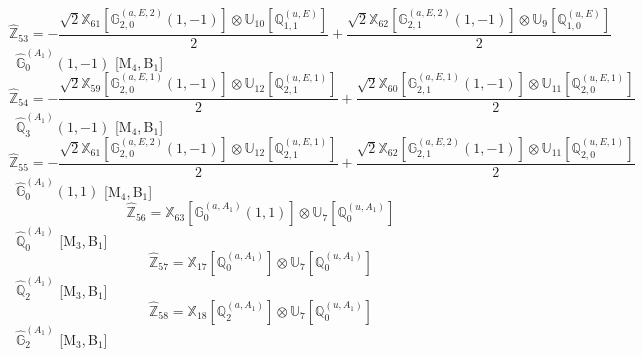 \documentclass[fleqn,10pt,landscape]{article}
\begin{document}
\begin{itemize}
\begin{dmath*}
\hat{\mathbb{Z}}_{53}=- \frac{\sqrt{2} \mathbb{X}_{61}[\mathbb{G}_{2,0}^{(a,E,2)}(1,-1)] \otimes\mathbb{U}_{10}[\mathbb{Q}_{1,1}^{(u,E)}]}{2} + \frac{\sqrt{2} \mathbb{X}_{62}[\mathbb{G}_{2,1}^{(a,E,2)}(1,-1)] \otimes\mathbb{U}_{9}[\mathbb{Q}_{1,0}^{(u,E)}]}{2}
\end{dmath*}
\vspace{4mm}
\noindent {} $\,\,\,\hat{\mathbb{G}}_{0}^{(A_{1})}(1,-1)$ [M$_{4}$,\,B$_{1}$]
\begin{dmath*}
\hat{\mathbb{Z}}_{54}=- \frac{\sqrt{2} \mathbb{X}_{59}[\mathbb{G}_{2,0}^{(a,E,1)}(1,-1)] \otimes\mathbb{U}_{12}[\mathbb{Q}_{2,1}^{(u,E,1)}]}{2} + \frac{\sqrt{2} \mathbb{X}_{60}[\mathbb{G}_{2,1}^{(a,E,1)}(1,-1)] \otimes\mathbb{U}_{11}[\mathbb{Q}_{2,0}^{(u,E,1)}]}{2}
\end{dmath*}
\vspace{4mm}
\noindent {} $\,\,\,\hat{\mathbb{Q}}_{3}^{(A_{1})}(1,-1)$ [M$_{4}$,\,B$_{1}$]
\begin{dmath*}
\hat{\mathbb{Z}}_{55}=- \frac{\sqrt{2} \mathbb{X}_{61}[\mathbb{G}_{2,0}^{(a,E,2)}(1,-1)] \otimes\mathbb{U}_{12}[\mathbb{Q}_{2,1}^{(u,E,1)}]}{2} + \frac{\sqrt{2} \mathbb{X}_{62}[\mathbb{G}_{2,1}^{(a,E,2)}(1,-1)] \otimes\mathbb{U}_{11}[\mathbb{Q}_{2,0}^{(u,E,1)}]}{2}
\end{dmath*}
\vspace{4mm}
\noindent {} $\,\,\,\hat{\mathbb{G}}_{0}^{(A_{1})}(1,1)$ [M$_{4}$,\,B$_{1}$]
\begin{dmath*}
\hat{\mathbb{Z}}_{56}=\mathbb{X}_{63}[\mathbb{G}_{0}^{(a,A_{1})}(1,1)] \otimes\mathbb{U}_{7}[\mathbb{Q}_{0}^{(u,A_{1})}]
\end{dmath*}
\vspace{4mm}
\noindent {} $\,\,\,\hat{\mathbb{Q}}_{0}^{(A_{1})}$ [M$_{3}$,\,B$_{1}$]
\begin{dmath*}
\hat{\mathbb{Z}}_{57}=\mathbb{X}_{17}[\mathbb{Q}_{0}^{(a,A_{1})}] \otimes\mathbb{U}_{7}[\mathbb{Q}_{0}^{(u,A_{1})}]
\end{dmath*}
\vspace{4mm}
\noindent {} $\,\,\,\hat{\mathbb{Q}}_{2}^{(A_{1})}$ [M$_{3}$,\,B$_{1}$]
\begin{dmath*}
\hat{\mathbb{Z}}_{58}=\mathbb{X}_{18}[\mathbb{Q}_{2}^{(a,A_{1})}] \otimes\mathbb{U}_{7}[\mathbb{Q}_{0}^{(u,A_{1})}]
\end{dmath*}
\vspace{4mm}
\noindent {} $\,\,\,\hat{\mathbb{G}}_{2}^{(A_{1})}$ [M$_{3}$,\,B$_{1}$]
\begin{dmath*}

\end{dmath*}
\end{itemize}
\end{document}
